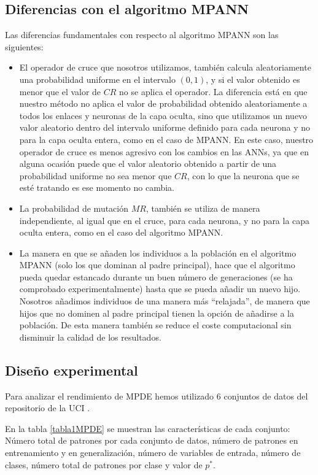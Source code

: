 \subsection{Diferencias con el algoritmo MPANN}\label{diferencias}
\noindent Las diferencias fundamentales con respecto al algoritmo MPANN \cite{Abbass2002a} son las
siguientes:
\begin{itemize}
	\item El operador de cruce que nosotros utilizamos, también calcula aleatoriamente una
probabilidad uniforme en el intervalo $(0,1)$, y si el valor obtenido es menor que
el	valor de $CR$ no se aplica el operador. La diferencia está en que nuestro método no aplica el
valor de probabilidad obtenido aleatoriamente a todos los enlaces y neuronas de la capa oculta, sino
que utilizamos un nuevo valor aleatorio dentro del intervalo uniforme definido para
cada neurona y no para la capa oculta entera, como en el caso de MPANN. En este caso, nuestro
operador de cruce es menos agresivo con los cambios en las ANNs, ya que en alguna ocasión puede
que el valor aleatorio obtenido a partir de una probabilidad uniforme no sea menor que $CR$, con lo
que la neurona que se esté tratando es ese momento no cambia.
	\item La probabilidad de mutación $MR$, también se utiliza de manera independiente, al igual que
en el cruce, para cada neurona, y no para la capa oculta entera, como en el caso del algoritmo
MPANN.
	\item La manera en que  se añaden los individuos a la población en el algoritmo MPANN
	(solo los que dominan al padre principal), hace que el algoritmo pueda quedar estancado durante
	un buen número de generaciones (se ha comprobado experimentalmente) hasta que se pueda añadir
	un nuevo hijo. Nosotros añadimos individuos de una manera más ``relajada'', de
	manera que hijos que no dominen al padre principal tienen la opción de añadirse a la
	población. De esta manera también se reduce el coste computacional sin disminuir la
	calidad de los resultados.
\end{itemize}

\subsection{Diseño experimental}
\noindent Para analizar el rendimiento de MPDE hemos utilizado 6
conjuntos de datos del repositorio de la UCI \cite{UCI2007}.

En la tabla \ref{tabla1MPDE} se muestran las características de cada
conjunto: Número total de patrones por cada
conjunto de datos, número de patrones en entrenamiento y en generalización, número de
variables de entrada, número de clases, número total de patrones por clase y valor de $p^*$.


